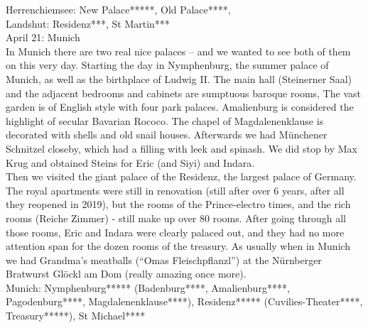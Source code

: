 Herrenchiemsee: New Palace*****, Old Palace****, \\
Landshut: Residenz***, St Martin***\\

April 21: Munich\\
In Munich there are two real nice palaces -- and we wanted to see both of them on this very day. Starting the day in Nymphenburg, the summer palace of Munich, as well as the birthplace of Ludwig II. The main hall (Steinerner Saal) and the adjacent bedrooms and cabinets are sumptuous baroque rooms, The vast garden is of English style with four park palaces. Amalienburg is considered the highlight of secular Bavarian Rococo. The chapel of Magdalenenklause is decorated with shells and old snail houses. Afterwards we had M\"unchener Schnitzel closeby, which had a filling with leek and spinash. We did stop by Max Krug and obtained Steins for Eric (and Siyi) and Indara.\\
Then we visited the giant palace of the Residenz, the largest palace of Germany. The royal apartments were still in renovation (still after over 6 years, after all they reopened in 2019), but the rooms of the Prince-electro times, and the rich rooms (Reiche Zimmer) - still make up over 80 rooms. After going through all those rooms, Eric and Indara were clearly palaced out, and they had no more attention span for the dozen rooms of the treasury. As usually when in Munich we had Grandma's meatballs (``Omas Fleischpflanzl'') at the N\"urnberger Bratwurst Gl\"ockl am Dom (really amazing once more).\\

Munich: Nymphenburg***** (Badenburg****, Amalienburg****, Pagodenburg****, Magdalenenklause****), Residenz***** (Cuvilies-Theater****, Treasury*****), St Michael****\\

